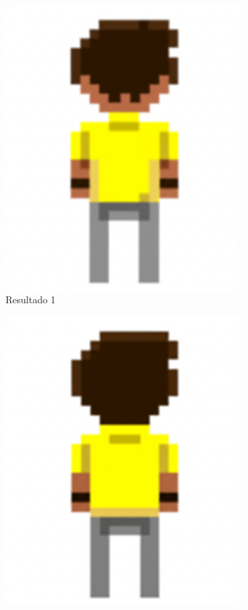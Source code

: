 \begin{figure}[htbp]
\begin{subfigure}{0.3\linewidth}
        \includegraphics[width=1\linewidth]{figs/geminiPro/chat12/02_res1.png}
        \caption{\small Resultado 1}
        \label{fig:geminiProBack2a}
    \end{subfigure}
    \begin{subfigure}{0.3\linewidth}
        \includegraphics[width=1\linewidth]{figs/geminiPro/chat12/02_res2.png}

\end{subfigure}
\end{figure}
